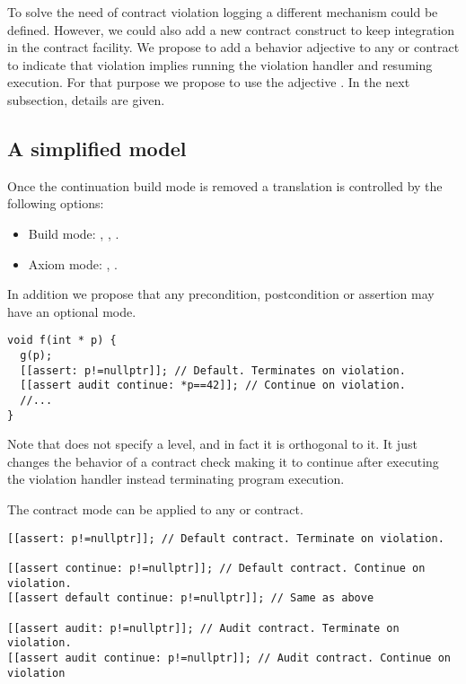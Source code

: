 To solve the need of contract violation logging a different mechanism could be
defined. However, we could also add a new contract construct to keep integration
in the contract facility. We propose to add a behavior adjective to any 
or  contract to indicate that violation implies running the violation
handler and resuming execution. For that purpose we propose to use the adjective
. In the next subsection, details are given.

\subsection{A simplified model}

Once the continuation build mode is removed a translation is controlled by the
following options:

\begin{itemize}
  \item Build mode: , , .
  \item Axiom mode: , .
\end{itemize}

In addition we propose that any precondition, postcondition or assertion may
have an optional mode. 

\begin{lstlisting}
void f(int * p) {
  g(p);
  [[assert: p!=nullptr]]; // Default. Terminates on violation.
  [[assert audit continue: *p==42]]; // Continue on violation.
  //...
}
\end{lstlisting}

Note that  does not specify a level, and in fact it is
orthogonal to it. It just changes the behavior of a contract check making it to
continue after executing the violation handler instead terminating program
execution.

The contract mode  can be applied to any  or
 contract.

\begin{lstlisting}
[[assert: p!=nullptr]]; // Default contract. Terminate on violation.

[[assert continue: p!=nullptr]]; // Default contract. Continue on violation.
[[assert default continue: p!=nullptr]]; // Same as above

[[assert audit: p!=nullptr]]; // Audit contract. Terminate on violation.
[[assert audit continue: p!=nullptr]]; // Audit contract. Continue on violation
\end{lstlisting}

